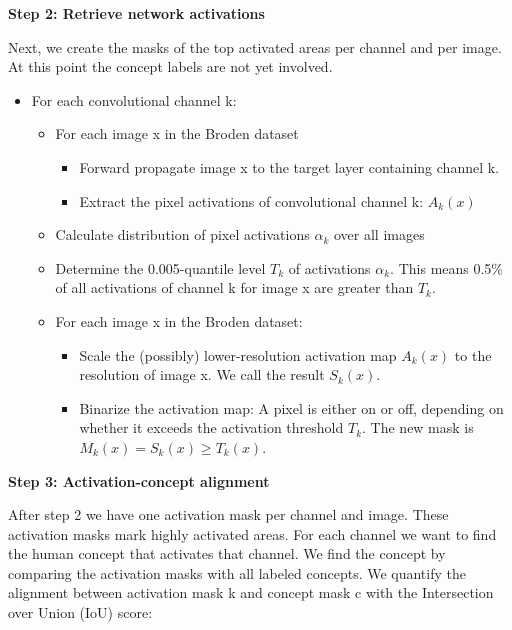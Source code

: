\documentclass[
  12pt,
]{krantz}
\providecommand{\tightlist}{%
  \setlength{\itemsep}{0pt}\setlength{\parskip}{0pt}}
\begin{document}
\textbf{Step 2: Retrieve network activations}

Next, we create the masks of the top activated areas per channel and per image.
At this point the concept labels are not yet involved.

\begin{itemize}
\tightlist
\item
  For each convolutional channel k:

  \begin{itemize}
  \tightlist
  \item
    For each image x in the Broden dataset

    \begin{itemize}
    \tightlist
    \item
      Forward propagate image x to the target layer containing channel k.
    \item
      Extract the pixel activations of convolutional channel k: \(A_k(x)\)
    \end{itemize}
  \item
    Calculate distribution of pixel activations \(\alpha_k\) over all images
  \item
    Determine the 0.005-quantile level \(T_k\) of activations \(\alpha_k\). This means 0.5\% of all activations of channel k for image x are greater than \(T_k\).
  \item
    For each image x in the Broden dataset:

    \begin{itemize}
    \tightlist
    \item
      Scale the (possibly) lower-resolution activation map \(A_k(x)\) to the resolution of image x. We call the result \(S_k(x)\).
    \item
      Binarize the activation map: A pixel is either on or off, depending on whether it exceeds the activation threshold \(T_k\). The new mask is \(M_k(x)=S_k(x)\geq{}T_k(x)\).
    \end{itemize}
  \end{itemize}
\end{itemize}

\textbf{Step 3: Activation-concept alignment}

After step 2 we have one activation mask per channel and image.
These activation masks mark highly activated areas.
For each channel we want to find the human concept that activates that channel.
We find the concept by comparing the activation masks with all labeled concepts.
We quantify the alignment between activation mask k and concept mask c with the Intersection over Union (IoU) score:
\end{document}
